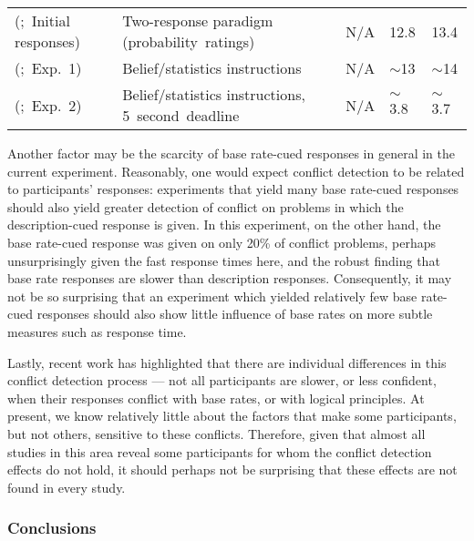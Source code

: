 \begin{table}
{\begin{tabular}{ p{} p{} p{} p{} p{}}
      \citeauthor{Pennycook2012b} (\citeyear{Pennycook2012b};~Initial responses)          &  Two-response paradigm \mbox{(probability~ratings)} &  N/A                         &  12.8           &  13.4          \\[.75cm]
      \citeauthor{Pennycook2014} (\citeyear{Pennycook2014};~Exp.~1)                       &  Belief/statistics instructions                     &  N/A                         &  $\sim$13       &  $\sim$14      \\[.75cm]
      \citeauthor{Pennycook2014} (\citeyear{Pennycook2014};~Exp.~2)                       &  Belief/statistics instructions, 5~second~deadline  &  N/A                         &  $\sim$3.8      &  $\sim$3.7     \\[.75cm]
      \bottomrule
    \end{tabular}
  }
\end{table}


Another factor may be the scarcity of base rate-cued responses
in general in the current experiment.
Reasonably, one would expect conflict detection to be 
related to participants' responses:
experiments that yield many base rate-cued responses
should also yield greater detection of conflict
on problems in which the description-cued response is given.
In this experiment, on the other hand,
the base rate-cued response was given on only 20\% of conflict problems,
perhaps unsurprisingly given the fast response times here,
and the robust finding that base rate responses
are slower than description responses.
Consequently, it may not be so surprising that
an experiment which yielded relatively few base rate-cued responses
should also show little influence of base rates 
on more subtle measures such as response time.

Lastly, recent work 
\citep[e.g.][]{DeNeys2010,Mevel2014} has highlighted
that there are individual differences in
this conflict detection process ---
not all participants are slower, or less confident,
when their responses conflict with base rates,
or with logical principles.
At present, we know relatively little about the factors
that make some participants, but not others,
sensitive to these conflicts.
Therefore, given that almost all studies in this area
reveal some participants for whom
the conflict detection effects do not hold,
it should perhaps not be surprising that 
these effects are not found in every study.

\subsubsection{Conclusions}

